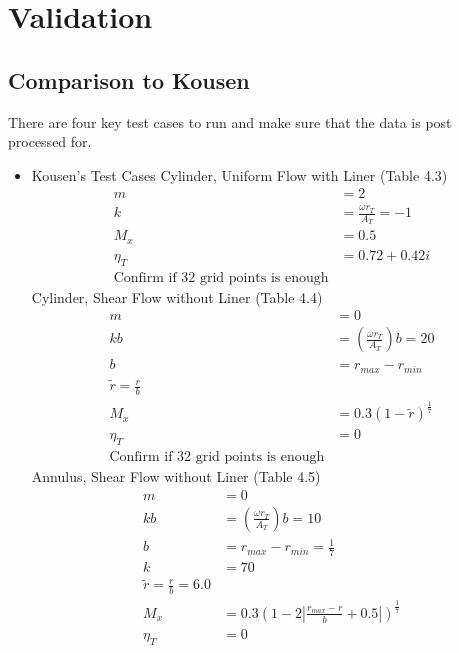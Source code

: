 \documentclass[12pt]{uthesis-v12}  %
\begin{document}
    \section{Validation}
    \subsection{Comparison to Kousen}


There are four key test cases to run and make sure that the data is post processed 
for.
\begin{itemize}
    \item Kousen's Test Cases
        \subitem Cylinder, Uniform Flow with Liner (Table 4.3)
        \begin{align*}
            m &= 2 \\
            k &= \frac{\omega r_T}{A_T} = -1 \\
            M_x &= 0.5 \\
            \eta_T &= 0.72 + 0.42i\\
            \text{Confirm if 32 grid points is enough}
        \end{align*} 
        \subitem Cylinder, Shear Flow without Liner (Table 4.4)
        \begin{align*}
            m &= 0 \\
            kb &= \left(\frac{\omega r_T}{A_T}\right)b = 20 \\
            b &= r_{max} - r_{min} \\
            \tilde{r} = \frac{r}{b} \\
            M_x &= 0.3(1-\tilde{r})^{\frac{1}{7}} \\
            \eta_T &= 0\\
            \text{Confirm if 32 grid points is enough}
        \end{align*}
        \subitem Annulus, Shear Flow without Liner (Table 4.5)
        \begin{align*}
            m &= 0 \\
            kb &= \left(\frac{\omega r_T}{A_T}\right)b = 10 \\
            b &= r_{max} - r_{min}  = \frac{1}{7}\\
            k &= 70 \\
            \tilde{r} = \frac{r}{b} = 6.0 \\
            M_x &= 0.3\left(1 - 2 \left| \frac{r_{max}-r}{b} + 0.5 \right|  \right)^{\frac{1}{7}} \\
            \eta_T &= 0\\

\end{align*}
\end{itemize}
\end{document}

